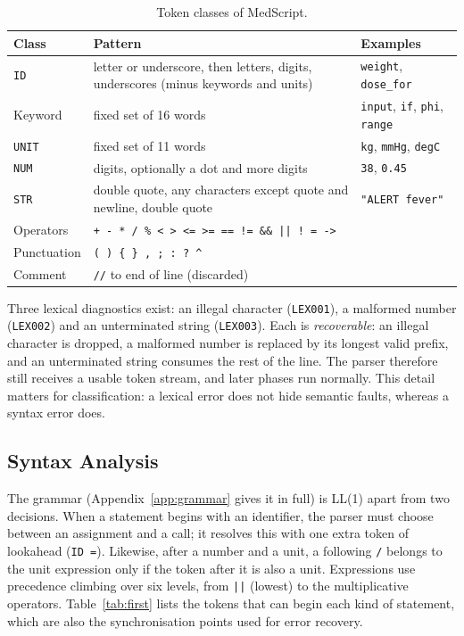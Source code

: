 \documentclass[conference]{IEEEtran}
\newcommand{\code}[1]{\texttt{#1}}
\providecommand{\textasciicircum}{\^{}}
\begin{document}
\begin{table}[t]
\centering
\caption{Token classes of MedScript.}
\label{tab:tokens}
\footnotesize
\begin{tabular}{p{1.1cm}p{4.2cm}p{2.5cm}}
\toprule
\textbf{Class} & \textbf{Pattern} & \textbf{Examples}\\
\midrule
\code{ID} & letter or underscore, then letters, digits, underscores (minus keywords and units) & \code{weight}, \code{dose\_for}\\
Keyword & fixed set of 16 words & \code{input}, \code{if}, \code{phi}, \code{range}\\
\code{UNIT} & fixed set of 11 words & \code{kg}, \code{mmHg}, \code{degC}\\
\code{NUM} & digits, optionally a dot and more digits & \code{38}, \code{0.45}\\
\code{STR} & double quote, any characters except quote and newline, double quote & \code{"ALERT fever"}\\
Operators & \code{+ - * / \% < > <= >= == != \&\& || ! = ->} & \\
Punctuation & \code{( ) \{ \} , ; : ? \textasciicircum} & \\
Comment & \code{//} to end of line (discarded) & \\
\bottomrule
\end{tabular}
\end{table}

Three lexical diagnostics exist: an illegal character (\code{LEX001}), a malformed number (\code{LEX002}) and an
unterminated string (\code{LEX003}). Each is \emph{recoverable}: an illegal character is dropped, a malformed number
is replaced by its longest valid prefix, and an unterminated string consumes the rest of the line. The parser
therefore still receives a usable token stream, and later phases run normally. This detail matters for
classification: a lexical error does not hide semantic faults, whereas a syntax error does.

\subsection{Syntax Analysis}

The grammar (Appendix~\ref{app:grammar} gives it in full) is LL(1) apart from two decisions. When a statement begins with an
identifier, the parser must choose between an assignment and a call; it resolves this with one extra token of
lookahead (\code{ID =}). Likewise, after a number and a unit, a following \code{/} belongs to the unit expression
only if the token after it is also a unit. Expressions use precedence climbing over six levels, from \code{||}
(lowest) to the multiplicative operators. Table~\ref{tab:first} lists the tokens that can begin each kind of
statement, which are also the synchronisation points used for error recovery.
\end{document}
